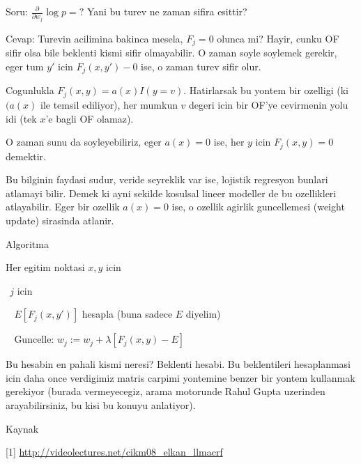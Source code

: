 \documentclass[12pt,fleqn]{article}\usepackage{../common}
\begin{document}
Soru: $\frac{\partial}{\partial w_j} \log p = ?$ Yani bu turev ne zaman sifira esittir? 

Cevap: Turevin acilimina bakinca mesela, $F_j=0$ olunca mi? Hayir, cunku OF
sifir olsa bile beklenti kismi sifir olmayabilir. O zaman soyle soylemek
gerekir, eger tum $y'$ icin $F_j(x,y') - 0$ ise, o zaman turev sifir olur. 

Cogunlukla $F_j(x,y) = a(x)I(y=v)$. Hatirlarsak bu yontem bir ozelligi (ki
$(a(x)$ ile temsil ediliyor), her mumkun $v$ degeri icin bir OF'ye
cevirmenin yolu idi (tek $x$'e bagli OF olamaz).

O zaman sunu da soyleyebiliriz, eger $a(x) = 0$ ise, her $y$ icin $F_j(x,y)
= 0$ 
demektir. 

Bu bilginin faydasi sudur, veride seyreklik var ise, lojistik regresyon
bunlari atlamayi bilir. Demek ki ayni sekilde kosulsal lineer modeller de
bu ozellikleri atlayabilir. Eger bir ozellik $a(x)=0$ ise, o ozellik
agirlik guncellemesi (weight update) sirasinda atlanir. 

Algoritma

Her egitim noktasi $x,y$ icin

$ \ \ $$j$ icin
    
$ \ \ \ \ $$E[F_j(x,y')]$ hesapla (buna sadece $E$ diyelim)
       
$ \ \ \ \ $Guncelle: $w_j := w_j + \lambda[F_j(x,y) - E]$


Bu hesabin en pahali kismi neresi? Beklenti hesabi. Bu beklentileri
hesaplanmasi icin daha once verdigimiz matris carpimi yontemine benzer bir
yontem kullanmak gerekiyor (burada vermeyecegiz, arama motorunde Rahul
Gupta uzerinden arayabilirsiniz, bu kisi bu konuyu anlatiyor).

Kaynak

[1] \url{http://videolectures.net/cikm08\_elkan\_llmacrf}
\end{document}
